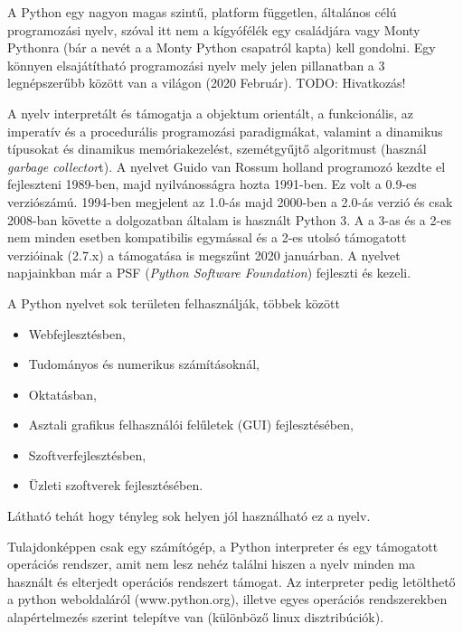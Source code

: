 

A Python egy nagyon magas szintű, platform független, általános célú
programozási nyelv, szóval itt nem a kígyófélék egy családjára vagy Monty
Pythonra (bár a nevét a a Monty Python csapatról kapta) kell gondolni.
Egy könnyen elsajátítható programozási nyelv mely jelen pillanatban a 3
legnépszerűbb között van a világon (2020 Február).
TODO: Hivatkozás!

A nyelv interpretált
és támogatja a objektum orientált, a funkcionális, az imperatív és a
procedurális programozási paradigmákat, valamint a dinamikus típusokat
és dinamikus memóriakezelést, szemétgyűjtő algoritmust (használ \emph{garbage collector}t). A
nyelvet Guido van Rossum holland programozó kezdte el fejleszteni
1989-ben, majd nyilvánosságra hozta 1991-ben. Ez volt a 0.9-es
verziószámú. 1994-ben megjelent az 1.0-ás majd 2000-ben a 2.0-ás verzió
és csak 2008-ban követte a dolgozatban általam is használt Python 3. A a
3-as és a 2-es nem minden esetben kompatibilis egymással és a 2-es
utolsó támogatott verzióinak (2.7.x) a támogatása is megszűnt 2020
januárban. A nyelvet napjainkban már a PSF (\emph{Python Software
Foundation}) fejleszti és kezeli.


A Python nyelvet sok területen felhasználják, többek között
\begin{itemize}
\item
  Webfejlesztésben,
\item
  Tudományos és numerikus számításoknál,
\item
  Oktatásban,
\item
  Asztali grafikus felhasználói felűletek (GUI) fejlesztésében,
\item
  Szoftverfejlesztésben,
\item
  Üzleti szoftverek fejlesztésében.
\end{itemize}
Látható tehát hogy tényleg sok helyen jól használható ez a nyelv.


Tulajdonképpen csak egy számítógép, a Python interpreter és egy
támogatott operációs rendszer, amit nem lesz nehéz találni hiszen a
nyelv minden ma használt és elterjedt operációs rendszert támogat. Az
interpreter pedig letölthető a python weboldaláról (www.python.org),
illetve egyes operációs rendszerekben alapértelmezés szerint telepítve
van (különböző linux disztribúciók).


